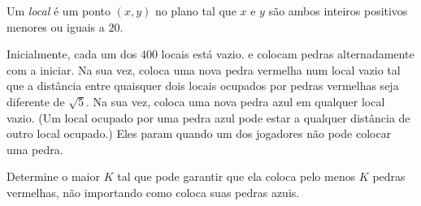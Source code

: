 Um \textit{local} é um ponto $(x, y)$ no plano tal que $x$ e $y$ são ambos inteiros positivos
menores ou iguais a $20$.

Inicialmente, cada um dos $400$ locais está vazio.  e  colocam pedras alternadamente com  a iniciar. Na sua vez,  coloca uma nova pedra vermelha num local vazio tal que a distância entre quaisquer dois locais ocupados por pedras vermelhas seja diferente de $\sqrt{5}$. Na sua vez,  coloca uma nova pedra azul em qualquer local vazio. (Um local ocupado por uma pedra azul pode
estar a qualquer distância de outro local ocupado.) Eles param quando um dos jogadores não pode colocar uma pedra.

Determine o maior $K$ tal que  pode garantir que ela coloca pelo menos $K$ pedras vermelhas, não importando como  coloca suas pedras azuis.

